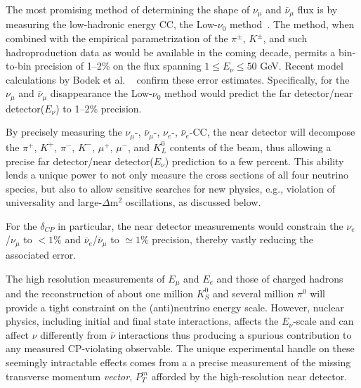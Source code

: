 The most promising method of determining the shape of $\nu_\mu$ and
$\bar \nu_\mu$ flux is by measuring the low-hadronic energy CC, the
Low-$\nu_0$ method~\cite{MISHRA-Nu0}. The method, when combined with
the empirical parametrization of the $\pi^{\pm}$, $K^{\pm}$, and such
hadroproduction data as would be available in the coming decade,
permits a bin-to-bin precision of 1--2\% on the flux spanning $1 \leq
E_\nu \leq 50$ GeV.  Recent model
calculations by Bodek et al. ~\cite{Bodek:2012uu} confirm these error
estimates.  Specifically, for the $\nu_\mu$ and $\bar \nu_\mu$
disappearance the Low-$\nu_0$ method would predict the far
detector/near detector($E_\nu$) to 1--2\% precision.

By precisely measuring the $\nu_\mu$-, $\bar \nu_\mu$-, $\nu_e$-,
$\bar \nu_e$-CC, the near detector will decompose the $\pi^+$, $K^+$,
$\pi^-$, $K^-$, $\mu^+$, $\mu^-$, and $K^0_L$ contents of the beam,
thus allowing a precise far detector/near detector($E_\nu$) prediction
to a few percent.  This ability lends a unique power to not only
measure the cross sections of all four neutrino species, but also to
allow sensitive searches for new physics, e.g., violation of
universality and large-$\Delta$m$^2$ oscillations, as
discussed %
below.

\noindent
For the $\delta_{CP}$ in particular, the near detector measurements
would constrain the $\nu_e$/$\nu_\mu$ to $<1\%$ and $\bar \nu_e$/$\bar
\nu_\mu$ to $\simeq 1\%$ precision, thereby vastly reducing the
associated error.



The high resolution measurements of $E_\mu$ and $E_e$ and those of
charged hadrons and the reconstruction of about one million $K^0_S$
and several million $\pi^0$ will provide a tight constraint on the
(anti)neutrino energy scale.  However, nuclear physics, including
initial and final state interactions, affects the $E_\nu$-scale and
can affect $\nu$ differently from $\bar\nu$ interactions thus
producing a spurious contribution to any measured CP-violating
observable.  The unique experimental handle on these seemingly
intractable effects comes from a a precise measurement of the missing
transverse momentum {\it vector},{ \bf{ $P^m_T$}} afforded by the
high-resolution near detector.


